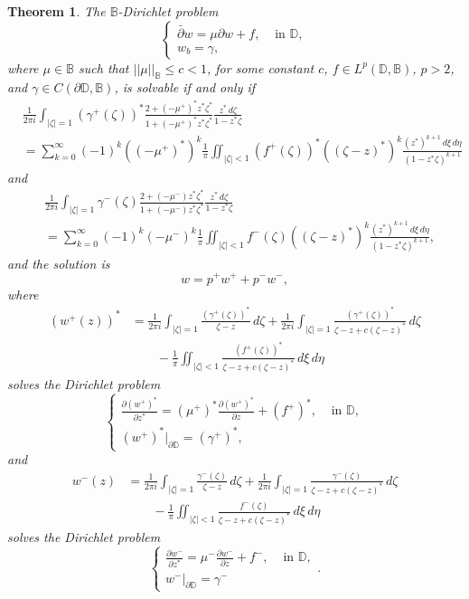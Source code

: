 \documentclass[12pt,reqno]{amsart}
\newtheorem{theorem}{Theorem}[section]
\theoremstyle{definition}
\theoremstyle{remark}
\newcommand{\p}{\partial}
\newcommand{\dbar}{\bar\partial}
\newcommand{\bc}{\mathbb{B}}
\newcommand{\disk}{\mathbb{D}}
\begin{document}
\begin{theorem}
    The $\bc$-Dirichlet problem 
    \[
        \begin{cases}
            \dbar w = \mu \p w + f, & \text{ in } \disk,\\
            w_b = \gamma,
        \end{cases}
    \]
    where $\mu \in \bc$ such that $||\mu||_\bc\leq c < 1$, for some constant $c$, $f \in L^p(\disk,\bc)$, $p>2$, and $\gamma \in C(\p\disk,\bc)$, is solvable if and only if
    \begin{align*}
        &\frac{1}{2\pi i} \int_{|\zeta| = 1} (\gamma^+(\zeta))^* \frac{2 + (-\mu^+)^* z^* \zeta^*}{1 + (-\mu^+)^* z^*\zeta^*} \frac{z^* \,d\zeta}{1-z^*\zeta} \\
        &= \sum_{k=0}^{\infty} (-1)^k ((-\mu^+)^*)^k \frac{1}{\pi} \iint_{|\zeta|<1} (f^+(\zeta))^* ((\zeta - z)^*)^k \frac{(z^*)^{k+1} \,d\xi\,d\eta}{(1-z^*\zeta)^{k+1}}
    \end{align*}
    and 
    \begin{align*}
        &\frac{1}{2\pi i} \int_{|\zeta| = 1} \gamma^-(\zeta) \frac{2 + (-\mu^-)z^* \zeta^*}{1 + (-\mu^-)z^*\zeta^*} \frac{z^* \,d\zeta}{1-z^*\zeta} \\
        &= \sum_{k=0}^{\infty} (-1)^k (-\mu^-)^k \frac{1}{\pi} \iint_{|\zeta|<1} f^-(\zeta) ((\zeta - z)^*)^k \frac{(z^*)^{k+1} \,d\xi\,d\eta}{(1-z^*\zeta)^{k+1}},
    \end{align*}
    and the solution is 
    \[
        w = p^+ w^+ + p^- w^-,
    \]
    where 
    \begin{align*}
        (w^+(z))^* &= \frac{1}{2\pi i} \int_{|\zeta| =1} \frac{(\gamma^+(\zeta))^*}{\zeta - z} \,d\zeta + \frac{1}{2\pi i} \int_{|\zeta| =1} \frac{(\gamma^+(\zeta))^*}{\zeta - z + c(\zeta - z)^*} \,d\zeta \\
        &\quad\quad- \frac{1}{\pi} \iint_{|\zeta|<1} \frac{(f^+(\zeta))^*}{\zeta - z + c(\zeta - z)^*}\,d\xi\,d\eta
    \end{align*}
    solves the Dirichlet problem 
    \[
        \begin{cases}
            \frac{\p (w^+)^*}{\p z^*} = (\mu^+)^* \frac{\p (w^+)^*}{\p z} + (f^+)^*, & \text{ in } \disk,\\
            (w^+)^*|_{\p\disk} = (\gamma^+)^*,
        \end{cases}
    \]
    and 
     \begin{align*}
        w^-(z) &= \frac{1}{2\pi i} \int_{|\zeta| =1} \frac{\gamma^-(\zeta)}{\zeta - z} \,d\zeta + \frac{1}{2\pi i} \int_{|\zeta| =1} \frac{\gamma^-(\zeta)}{\zeta - z + c(\zeta - z)^*} \,d\zeta \\
        &\quad\quad - \frac{1}{\pi} \iint_{|\zeta|<1} \frac{f^-(\zeta)}{\zeta - z + c(\zeta - z)^*}\,d\xi\,d\eta
    \end{align*}
    solves the Dirichlet problem 
    \[
        \begin{cases}
            \frac{\p w^-}{\p z^*} = \mu^- \frac{\p w^-}{\p z} + f^- ,& \text{ in } \disk,\\
            w^-|_{\p\disk} = \gamma^-
        \end{cases}.
    \]
\end{theorem}
\end{document}
